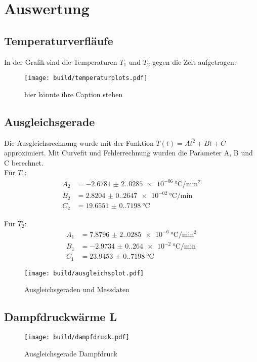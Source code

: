 \section{Auswertung}
\label{sec:Auswertung}


\subsection{Temperaturverfläufe}
In der Grafik sind die Temperaturen $T_1$ und $T_2$ gegen die Zeit aufgetragen:
\begin{figure}
  \centering
  \texttt{[image: build/temperaturplots.pdf]}
  \caption{hier könnte ihre Caption stehen}
\end{figure}

\subsection{Ausgleichsgerade}
Die Ausgleichsrechnung wurde mit der Funktion $T(t) = A t^2 + B t + C$ approximiert. Mit Curvefit und Fehlerrechnung 
wurden die Parameter A, B und C berechnet.\\
Für $T_1$:
\begin{align*}%
  A_2 &= \SI{-2.6781(2.0285)e-06}{\degreeCelsius\per\square\minute}\\
  B_2 &= \SI{2.8204(0.2647)e-02}{\degreeCelsius\per\minute}\\
  C_2 &= \SI{19.6551(0.7198)}{\degreeCelsius}
\end{align*}

Für $T_2$:
\begin{align*}
  A_1 &= \SI{7.8796(2.0285)e-6}{\degreeCelsius\per\square\minute}\\
  B_1 &= \SI{-2.9734(0.264)e-2}{\degreeCelsius\per\minute}\\
  C_1 &= \SI{23.9453(0.7198)}{\degreeCelsius}
\end{align*}

\begin{figure}
  \centering
  \texttt{[image: build/ausgleichsplot.pdf]}
  \caption{Ausgleichsgeraden und Messdaten}
\end{figure}

\subsection{Dampfdruckwärme L}

\begin{figure}
  \centering
  \texttt{[image: build/dampfdruck.pdf]}
  \caption{Ausgleichsgerade Dampfdruck}
\end{figure}

